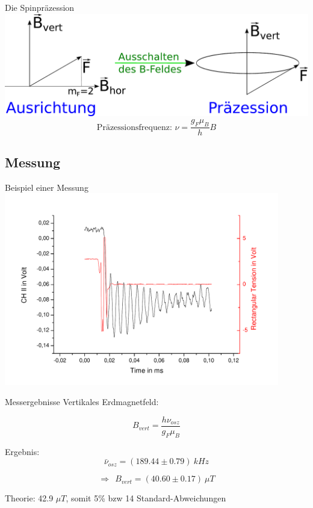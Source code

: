\documentclass{beamer}
\begin{document}
\begin{frame}{Die Spinpräzession}
\centering \includegraphics[width=\textwidth]{Bilder/praez.pdf}
$$\text{Präzessionsfrequenz: \ \ \ } \nu = \frac{g_F\mu_B}{h}B $$
\end{frame}

\subsection{Messung}
\begin{frame}{Beispiel einer Messung}
\centering \includegraphics[width=0.9\textwidth]{Bilder/Spinpr.pdf}
\end{frame}

\begin{frame}{Messergebnisse}
Vertikales Erdmagnetfeld:

$$ B_{vert} = \frac{h\nu_{osz}}{g_F\mu_B} $$

\pause Ergebnis: $$\bar\nu_{osz} = (189.44 \pm 0.79)\ kHz$$

$$\Rightarrow\ \ \boxed{B_{vert} = (40.60 \pm 0.17)\ \mu T}$$ 

Theorie: 42.9 $\mu T$, somit 5\% bzw 14 Standard-Abweichungen
\end{frame}
\end{document}
